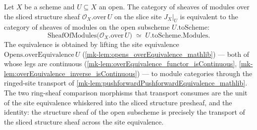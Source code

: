 \begin{definition}
  \label{mk-def:over_restrict_equiv}
  \leanok

  Let \(X\) be a scheme and \(U \subseteq X\) an open. The category of sheaves of modules
  over the sliced structure sheaf \(\mathcal{O}_X.\mathrm{over}\,U\) on the slice site
  \(J_X|_U\) is equivalent to the category of sheaves of modules on the open subscheme
  \(U.\mathrm{toScheme}\):
  \[
    \mathrm{SheafOfModules}\bigl(\mathcal{O}_X.\mathrm{over}\,U\bigr)
    \;\simeq\; U.\mathrm{toScheme}.\mathrm{Modules}.
  \]
  The equivalence is obtained by lifting the site equivalence
  \(\mathrm{Opens.overEquivalence}\,U\) (\ref{mk-lem:opens_overEquivalence_mathlib}) — both of
  whose legs are continuous (\ref{mk-lem:overEquivalence_functor_isContinuous},
  \ref{mk-lem:overEquivalence_inverse_isContinuous}) — to module categories through the
  ringed-site transport of \ref{mk-lem:pushforwardPushforwardEquivalence_mathlib}. The two
  ring-sheaf comparison morphisms that transport consumes are the unit of the site
  equivalence whiskered into the sliced structure presheaf, and the identity: the structure
  sheaf of the open subscheme is precisely the transport of the sliced structure sheaf
  across the site equivalence.
\end{definition}

